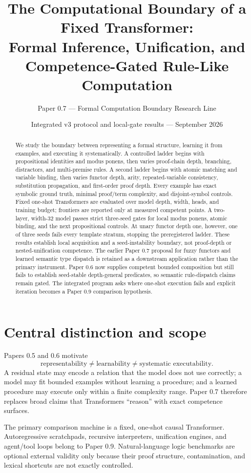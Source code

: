 \documentclass[10pt]{article}
\title{The Computational Boundary of a Fixed Transformer:\\Formal Inference, Unification, and Competence-Gated Rule-Like Computation}
\author{Paper 0.7 --- Formal Computation Boundary Research Line}
\date{Integrated v3 protocol and local-gate results --- September 2026}
\begin{document}
\maketitle
\begin{abstract}
We study the boundary between representing a formal structure, learning it from examples, and executing it systematically. A controlled ladder begins with propositional identities and modus ponens, then varies proof-chain depth, branching, distractors, and multi-premise rules. A second ladder begins with atomic matching and variable binding, then varies functor depth, arity, repeated-variable consistency, substitution propagation, and first-order proof depth. Every example has exact symbolic ground truth, minimal proof/term complexity, and disjoint-symbol controls. Fixed one-shot Transformers are evaluated over model depth, width, heads, and training budget; frontiers are reported only at measured competent points. A two-layer, width-32 model passes strict three-seed gates for local modus ponens, atomic binding, and the next propositional controls. At unary functor depth one, however, one of three seeds fails every template stratum, stopping the preregistered ladder. These results establish local acquisition and a seed-instability boundary, not proof-depth or nested-unification competence. The earlier Paper 0.7 proposal for fuzzy functors and learned semantic type dispatch is retained as a downstream application rather than the primary instrument. Paper 0.6 now supplies competent bounded composition but still fails to establish seed-stable depth-general predicates, so semantic rule-dispatch claims remain gated. The integrated program asks where one-shot execution fails and explicit iteration becomes a Paper 0.9 comparison hypothesis.
\end{abstract}

\section{Central distinction and scope}
Papers 0.5 and 0.6 motivate
\[
\boxed{\text{representability}\neq\text{learnability}\neq\text{systematic executability}.}
\]
A residual state may encode a relation that the model does not use correctly; a model may fit bounded examples without learning a procedure; and a learned procedure may execute only within a finite complexity range. Paper 0.7 therefore replaces broad claims that Transformers ``reason'' with exact competence surfaces.

The primary comparison machine is a fixed, one-shot causal Transformer. Autoregressive scratchpads, recursive interpreters, unification engines, and agent/tool loops belong to Paper 0.9. Natural-language logic benchmarks are optional external validity only because their proof structure, contamination, and lexical shortcuts are not exactly controlled.
\end{document}
